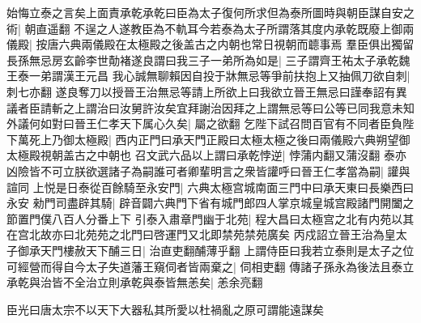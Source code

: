 始悔立泰之言矣上面責承乾承乾曰臣為太子復何所求但為泰所圖時與朝臣謀自安之術|{
	朝直遥翻}
不逞之人遂教臣為不軌耳今若泰為太子所謂落其度内承乾既廢上御兩儀殿|{
	按唐六典兩儀殿在太極殿之後盖古之内朝也常日視朝而聼事焉}
羣臣俱出獨留長孫無忌房玄齡李世勣褚遂良謂曰我三子一弟所為如是|{
	三子謂齊王祐太子承乾魏王泰一弟謂漢王元昌}
我心誠無聊賴因自投于牀無忌等爭前扶抱上又抽佩刀欲自刺|{
	刺七亦翻}
遂良奪刀以授晉王治無忌等請上所欲上曰我欲立晉王無忌曰謹奉詔有異議者臣請斬之上謂治曰汝舅許汝矣宜拜謝治因拜之上謂無忌等曰公等已同我意未知外議何如對曰晉王仁孝天下属心久矣|{
	屬之欲翻}
乞陛下試召問百官有不同者臣負陛下萬死上乃御太極殿|{
	西内正門曰承天門正殿曰太極太極之後曰兩儀殿六典朔望御太極殿視朝盖古之中朝也}
召文武六品以上謂曰承乾悖逆|{
	悖蒲内翻又蒲沒翻}
泰亦凶險皆不可立朕欲選諸子為嗣誰可者卿輩明言之衆皆讙呼曰晉王仁孝當為嗣|{
	讙與諠同}
上悦是日泰從百餘騎至永安門|{
	六典太極宫城南面三門中曰承天東曰長樂西曰永安}
勑門司盡辟其騎|{
	辟音闢六典門下省有城門郎四人掌京城皇城宫殿諸門開闔之節置門僕八百人分番上下}
引泰入肅章門幽于北苑|{
	程大昌曰太極宫之北有内苑以其在宫北故亦曰北苑苑之北門曰啓運門又北即禁苑禁苑廣矣}
丙戍詔立晉王治為皇太子御承天門樓赦天下酺三日|{
	治直吏翻酺薄乎翻}
上謂侍臣曰我若立泰則是太子之位可經營而得自今太子失道藩王窺伺者皆兩棄之|{
	伺相吏翻}
傳諸子孫永為後法且泰立承乾與治皆不全治立則承乾與泰皆無恙矣|{
	恙余亮翻}


臣光曰唐太宗不以天下大器私其所愛以杜禍亂之原可謂能遠謀矣

